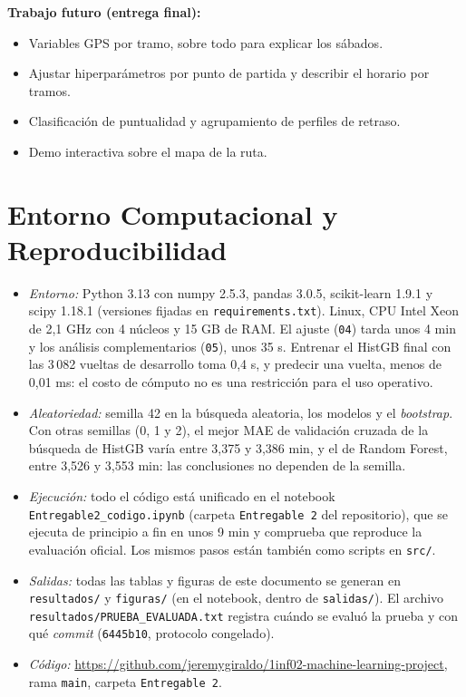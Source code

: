 \documentclass[conference,spanish]{IEEEtran}
\begin{document}
\textbf{Trabajo futuro (entrega final):}
\begin{itemize}
    \item Variables GPS por tramo, sobre todo para explicar los sábados.
    \item Ajustar hiperparámetros por punto de partida y describir el horario por tramos.
    \item Clasificación de puntualidad y agrupamiento de perfiles de retraso.
    \item Demo interactiva sobre el mapa de la ruta.
\end{itemize}

\section{Entorno Computacional y Reproducibilidad}
\begin{itemize}
    \item \emph{Entorno:} Python 3.13 con numpy 2.5.3, pandas 3.0.5, scikit-learn 1.9.1 y scipy 1.18.1 (versiones fijadas en \texttt{requirements.txt}). Linux, CPU Intel Xeon de 2,1 GHz con 4 núcleos y 15 GB de RAM. El ajuste (\texttt{04}) tarda unos 4 min y los análisis complementarios (\texttt{05}), unos 35 s. Entrenar el HistGB final con las 3\,082 vueltas de desarrollo toma 0,4 s, y predecir una vuelta, menos de 0,01 ms: el costo de cómputo no es una restricción para el uso operativo.
    \item \emph{Aleatoriedad:} semilla 42 en la búsqueda aleatoria, los modelos y el \textit{bootstrap}. Con otras semillas (0, 1 y 2), el mejor MAE de validación cruzada de la búsqueda de HistGB varía entre 3,375 y 3,386 min, y el de Random Forest, entre 3,526 y 3,553 min: las conclusiones no dependen de la semilla.
    \item \emph{Ejecución:} todo el código está unificado en el notebook \texttt{Entregable2\_codigo.ipynb} (carpeta \texttt{Entregable 2} del repositorio), que se ejecuta de principio a fin en unos 9 min y comprueba que reproduce la evaluación oficial. Los mismos pasos están también como scripts en \texttt{src/}.
    \item \emph{Salidas:} todas las tablas y figuras de este documento se generan en \texttt{resultados/} y \texttt{figuras/} (en el notebook, dentro de \texttt{salidas/}). El archivo \texttt{resultados/PRUEBA\_EVALUADA.txt} registra cuándo se evaluó la prueba y con qué \textit{commit} (\texttt{6445b10}, protocolo congelado).
    \item \emph{Código:} \url{https://github.com/jeremygiraldo/1inf02-machine-learning-project}, rama \texttt{main}, carpeta \texttt{Entregable 2}.
\end{itemize}
\end{document}
